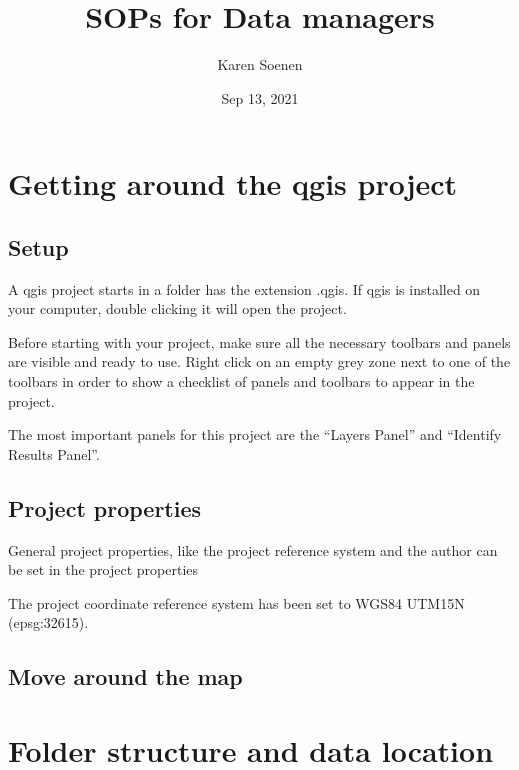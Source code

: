 \documentclass[letterpaper,10pt,english]{sphinxmanual}
\title{SOPs for Data managers}
\date{Sep 13, 2021}
\author{Karen Soenen}
\begin{document}
\pagestyle{empty}
\sphinxmaketitle
\pagestyle{plain}
\sphinxtableofcontents
\pagestyle{normal}
\label{\detokenize{index::doc}}



\chapter{Getting around the qgis project}
\label{\detokenize{01_intro:getting-around-the-qgis-project}}\label{\detokenize{01_intro::doc}}

\section{Set\sphinxhyphen{}up}
\label{\detokenize{01_intro:set-up}}
\sphinxAtStartPar
A qgis project starts in a folder has the extension .qgis. If qgis is installed on your computer, double clicking it will open the project.



\sphinxAtStartPar
Before starting with your project, make sure all the necessary toolbars and panels are visible and ready to use. Right click on an empty grey zone next to one of the toolbars in order to show a checklist of panels and toolbars to appear in the project.

\sphinxAtStartPar
The most important panels for this project are the “Layers Panel” and “Identify Results Panel”.




\section{Project properties}
\label{\detokenize{01_intro:project-properties}}
\sphinxAtStartPar
General project properties, like the project reference system and the author can be set in the project properties



\sphinxAtStartPar
The project coordinate reference system has been set to WGS84 UTM15N (epsg:32615).


\section{Move around the map}
\label{\detokenize{01_intro:move-around-the-map}}


\sphinxAtStartPar
{}


\chapter{Folder structure and data location}
\label{\detokenize{02_folder_hierarchy:folder-structure-and-data-location}}\label{\detokenize{02_folder_hierarchy::doc}}
\end{document}
